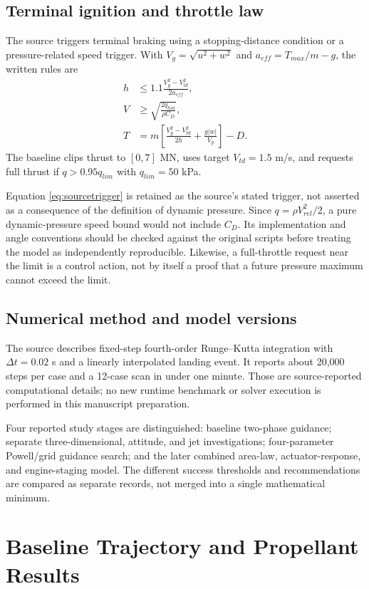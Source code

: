 \documentclass[11pt,a4paper]{article}
\begin{document}
\subsection{Terminal ignition and throttle law}
The source triggers terminal braking using a stopping-distance condition or a pressure-related speed trigger. With $V_g=\sqrt{u^2+w^2}$ and $a_{eff}=T_{max}/m-g$, the written rules are
\begin{align}
 h&\le1.1\frac{V_g^2-V_{td}^2}{2a_{eff}},\label{eq:stoprule}\\
 V&\ge\sqrt{\frac{2q_{lim}}{\rho C_D}},\label{eq:sourcetrigger}\\
 T&=m\left[\frac{V_g^2-V_{td}^2}{2h}+\frac{g|w|}{V_g}\right]-D.
\label{eq:thrustlaw}
\end{align}
The baseline clips thrust to $[0,7]$ MN, uses target $V_{td}=1.5$ m/s, and requests full thrust if $q>0.95q_{lim}$ with $q_{lim}=50$ kPa.

Equation \eqref{eq:sourcetrigger} is retained as the source's stated trigger, not asserted as a consequence of the definition of dynamic pressure. Since $q=\rho V_{rel}^2/2$, a pure dynamic-pressure speed bound would not include $C_D$. Its implementation and angle conventions should be checked against the original scripts before treating the model as independently reproducible. Likewise, a full-throttle request near the limit is a control action, not by itself a proof that a future pressure maximum cannot exceed the limit.

\subsection{Numerical method and model versions}
The source describes fixed-step fourth-order Runge--Kutta integration with $\Delta t=0.02$ s and a linearly interpolated landing event. It reports about 20,000 steps per case and a 12-case scan in under one minute. Those are source-reported computational details; no new runtime benchmark or solver execution is performed in this manuscript preparation.

Four reported study stages are distinguished: baseline two-phase guidance; separate three-dimensional, attitude, and jet investigations; four-parameter Powell/grid guidance search; and the later combined area-law, actuator-response, and engine-staging model. The different success thresholds and recommendations are compared as separate records, not merged into a single mathematical minimum.

\section{Baseline Trajectory and Propellant Results}
\end{document}
